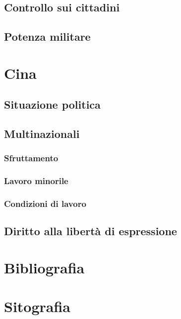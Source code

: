 \documentclass[a4paper, 12pt]{article}
\begin{document}
\subsection{Controllo sui cittadini}

\subsection{Potenza militare}

\section{Cina}

\subsection{Situazione politica}

\subsection{Multinazionali}

\subsubsection{Sfruttamento}

\subsubsection{Lavoro minorile}

\subsubsection{Condizioni di lavoro}

\subsection{Diritto alla libertà di espressione}

\section{Bibliografia}

\section{Sitografia}

\nocite{*}
\printbibliography[type=online, heading=subbibliography] 	
\end{document}
